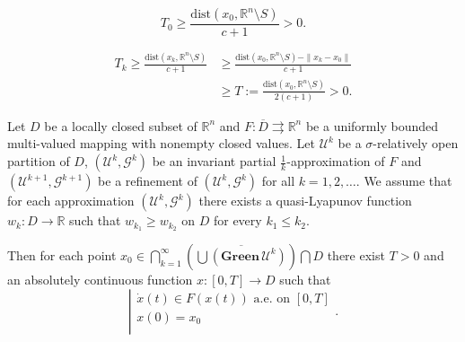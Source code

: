 \documentclass[10pt,a4paper]{amsart}
\begin{document}
    \begin{equation}\label{time}
        T_0 \ge \frac{\mathrm{dist}(x_0,\mathbb{R}^n \setminus S)}{c+1} > 0.
    \end{equation}

    \begin{equation}\label{time2}
        \begin{aligned}
            T_k   {\ge} \frac{\mathrm{dist}(x_k,\mathbb{R}^n \setminus S)}{c+1} &\ge \frac{\mathrm{dist}(x_0,\mathbb{R}^n \setminus S) - \|x_k-x_0\|}{c+1}\\ &\ge T:= \frac{\mathrm{dist}(x_0,\mathbb{R}^n \setminus S)}{2(c+1)} > 0.
        \end{aligned}
    \end{equation}

\begin{thm}\label{sol}
    Let $D$ be a locally closed subset of $\mathbb{R}^n$ and $F : \overline{D} \rightrightarrows \mathbb{R}^n$ be a uniformly bounded multi-valued mapping with nonempty closed values. Let $\mathcal{U}^k$ be a $\sigma$-relatively open partition of $D$, $(\mathcal{U}^k,\mathcal{G}^k)$ be an invariant partial $\frac{1}{k}$-approximation of $F$ and $(\mathcal{U}^{k+1},\mathcal{G}^{k+1})$ be a refinement of $(\mathcal{U}^k,\mathcal{G}^k)$ for all $k=1,2,\dots$. We assume that for each approximation $(\mathcal{U}^k,\mathcal{G}^k)$ there exists a quasi-Lyapunov function $w_k : D \to \mathbb{R}$ such that $w_{k_1} \ge w_{k_2}$ on $D$ for every $k_1 \le k_2$.

    Then for each point $x_0 \in \bigcap_{k=1}^{\infty}\left(\overline{\bigcup(\mathbf{Green} \,\mathcal{U}^k)}\right) \bigcap D$ there exist $T>0$ and an absolutely continuous function $x : [0,T] \to D$ such that
    $$\left| \begin{array}{l}
    \dot{x}(t) \in F(x(t)) \text{ a.e. on } [0,T]\\
    x(0) = x_0\\
    \end{array} \right..$$
\end{thm}
\end{document}
